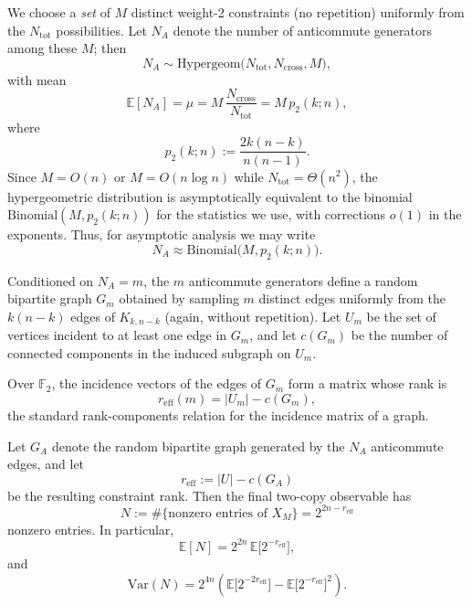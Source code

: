 \documentclass[a4paper,onecolumn,notitlepage,nofootinbib,longbibliography,superscriptaddress, floatfix, pra, aps, 10pt]{revtex4-2}
\begin{document}
We choose a \emph{set} of $M$ distinct weight-2 constraints (no repetition) uniformly from the $N_{\mathrm{tot}}$ possibilities. Let $N_A$ denote the number of anticommute generators among these $M$; then
\begin{equation}
  N_A \sim \mathrm{Hypergeom}\big(N_{\mathrm{tot}}, N_{\mathrm{cross}}, M\big),
\end{equation}
with mean
\begin{equation}
  \mathbb{E}[N_A] = \mu 
  = M\,\frac{N_{\mathrm{cross}}}{N_{\mathrm{tot}}}
  = M\,p_2(k;n),
\end{equation}
where
\begin{equation}
  p_2(k;n) := \frac{2k(n-k)}{n(n-1)}.
\end{equation}
Since $M=O(n)$ or $M=O(n\log n)$ while $N_{\mathrm{tot}}=\Theta(n^2)$, the hypergeometric distribution is asymptotically equivalent to the binomial $\mathrm{Binomial}(M,p_2(k;n))$ for the statistics we use, with corrections $o(1)$ in the exponents. Thus, for asymptotic analysis we may write
\begin{equation}
  N_A \approx \mathrm{Binomial}\big(M, p_2(k;n)\big).
\end{equation}

Conditioned on $N_A = m$, the $m$ anticommute generators define a random bipartite graph $G_m$ obtained by sampling $m$ distinct edges uniformly from the $k(n-k)$ edges of $K_{k,n-k}$ (again, without repetition). Let $U_m$ be the set of vertices incident to at least one edge in $G_m$, and let $c(G_m)$ be the number of connected components in the induced subgraph on $U_m$.

Over $\mathbb{F}_2$, the incidence vectors of the edges of $G_m$ form a matrix whose rank is
\begin{equation}
  r_{\mathrm{eff}}(m) = |U_m| - c(G_m),
\end{equation}
the standard rank-components relation for the incidence matrix of a graph.

Let $G_A$ denote the random bipartite graph generated by the $N_A$ anticommute edges, and let
\begin{equation}
  r_{\mathrm{eff}} := |U| - c(G_A)
\end{equation}
be the resulting constraint rank. Then the final two-copy observable has
\begin{equation}
  N := \#\{\text{nonzero entries of }X_M\}
  = 2^{2n - r_{\mathrm{eff}}}
\end{equation}
nonzero entries. In particular,
\begin{equation}
  \mathbb{E}[N] = 2^{2n}\,\mathbb{E}\big[2^{-r_{\mathrm{eff}}}\big],
\end{equation}
and
\begin{equation}
  \mathrm{Var}(N) 
  = 2^{4n}\left(\mathbb{E}\big[2^{-2r_{\mathrm{eff}}}\big] 
  - \mathbb{E}\big[2^{-r_{\mathrm{eff}}}\big]^2\right).
\end{equation}
\end{document}
